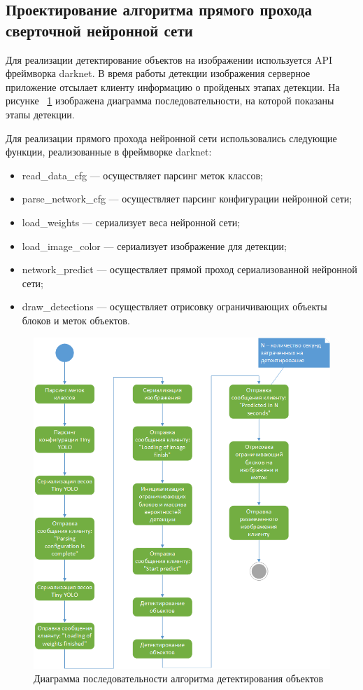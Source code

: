 \documentclass[a4paper,english,russian]{G2-105}
\begin{document}
\subsection{Проектирование алгоритма прямого прохода сверточной нейронной сети} \ttl
\par Для реализации детектирование объектов на изображении используется API фреймворка darknet. В время работы детекции изображения серверное приложение отсылает клиенту информацию о пройденых этапах детекции. На рисунке ~\ref{activitydetector} изображена диаграмма последовательности, на которой показаны этапы детекции.
\par Для реализации прямого прохода нейронной сети использовались следующие функции, реализованные в фреймворке darknet:
\begin{itemize}
\item read\_data\_cfg --- осуществляет парсинг меток классов;
\item parse\_network\_cfg --- осуществляет парсинг конфигурации нейронной сети;
\item load\_weights --- сериализует веса нейронной сети;
\item load\_image\_color --- сериализует изображение для детекции;
\item network\_predict --- осуществляет прямой проход сериализованной нейронной сети;
\item draw\_detections --- осуществляет отрисовку ограничивающих объекты блоков и меток объектов.
\end{itemize}
\begin{figure}
    \includegraphics[width=0.8\linewidth]{activitydetector.png}
    \caption{Диаграмма последовательности алгоритма детектирования объектов}
	\label{activitydetector}
\end{figure}
\ttl
\end{document}

